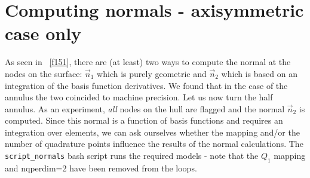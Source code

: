 \newpage
\section*{Computing normals - axisymmetric case only}

As seen in \stone~\ref{f151}, there are (at least) two ways to compute the normal at the
nodes on the surface: $\vec{n}_1$ which is purely geometric and $\vec{n}_2$ which is based 
on an integration of the basis function derivatives.
We found that in the case of the annulus the two coincided to machine precision. 
Let us now turn the half annulus. As an experiment, {\it all} nodes on the hull are flagged
and the normal $\vec{n}_2$ is computed. 
Since this normal is a function of basis functions and requires an integration 
over elements, we can ask ourselves whether the mapping and/or the number
of quadrature points influence the results of the normal calculations.
The {\tt script\_normals} bash script runs the required models - note that the
$Q_1$ mapping and nqperdim=2 have been removed from the loops.

